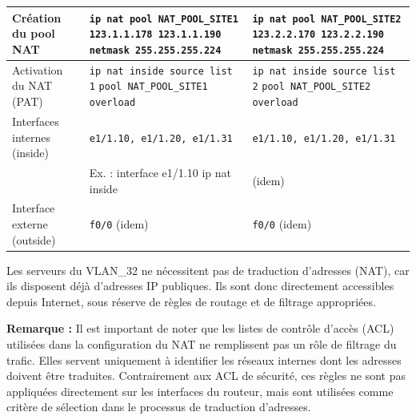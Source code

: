 \documentclass[12pt,a4paper, oneside]{memoir}
\begin{document}
\begin{landscape}
\begin{table}[H]
\begin{tabular}{|p{3cm}|p{10.3cm}|p{10.3cm}|}
		Création du pool NAT 
		&
		\small{\texttt{ip nat pool NAT\_POOL\_SITE1} %
		\texttt{123.1.1.178 123.1.1.190} %
		\texttt{netmask 255.255.255.224}}
		&
		\small{\texttt{ip nat pool NAT\_POOL\_SITE2} %
		\texttt{123.2.2.170 123.2.2.190} %
		\texttt{netmask 255.255.255.224}}
		\\
		\hline
		
		Activation du NAT (PAT)
		&
		\texttt{ip nat inside source list 1} %
		\texttt{pool NAT\_POOL\_SITE1 overload}
		&
		\texttt{ip nat inside source list 2} %
		\texttt{pool NAT\_POOL\_SITE2 overload}
		\\
		\hline
		
		Interfaces internes (inside)
		&
		\texttt{e1/1.10, e1/1.20, e1/1.31}
		&
		\texttt{e1/1.10, e1/1.20, e1/1.31}
		\\
		& Ex. : \newline
		interface e1/1.10 \newline
		ip nat inside & (idem)\\
		\hline
		
		Interface externe (outside)
		&
		\texttt{f0/0} (idem)
		&
		\texttt{f0/0} (idem)
		\\
		\hline
		
	\end{tabular}
	\label{tab:nat_configuration}
\end{table}
\end{landscape}
\medskip

\noindent
Les serveurs du VLAN\_32 ne nécessitent pas de traduction d’adresses (NAT), car ils disposent déjà d’adresses IP publiques. Ils sont donc directement accessibles depuis Internet, sous réserve de règles de routage et de filtrage appropriées.

\textbf{Remarque :} Il est important de noter que les listes de contrôle d’accès (ACL) utilisées dans la configuration du NAT ne remplissent pas un rôle de filtrage du trafic. Elles servent uniquement à identifier les réseaux internes dont les adresses doivent être traduites. Contrairement aux ACL de sécurité, ces règles ne sont pas appliquées directement sur les interfaces du routeur, mais sont utilisées comme critère de sélection dans le processus de traduction d’adresses.
\end{document}

